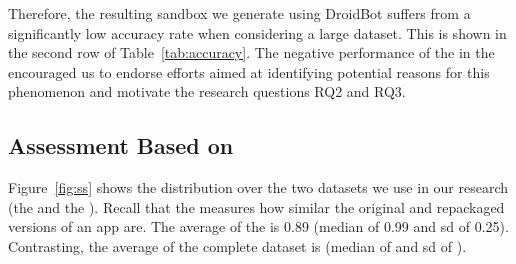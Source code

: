 



Therefore, the resulting sandbox we generate using
DroidBot suffers from a significantly low accuracy rate when considering a
large dataset.
This is shown in the second row of Table~\ref{tab:accuracy}.
The negative performance of the \mas in the \cds encouraged us to endorse efforts aimed at identifying potential reasons for
this phenomenon and motivate the research questions RQ2 and RQ3.



\subsection{Assessment Based on \sscore}

Figure~\ref{fig:ss} shows the \sscore distribution
over the two datasets we use in our research
(the \sds and the \cds).
Recall that the \sscore measures how similar the
original and repackaged versions of an app are.
The average \sscore of the
\sds is 0.89 (median of 0.99 and sd of 0.25). Contrasting,
the average \sscore of the complete dataset is
 (median of  and sd of ).

